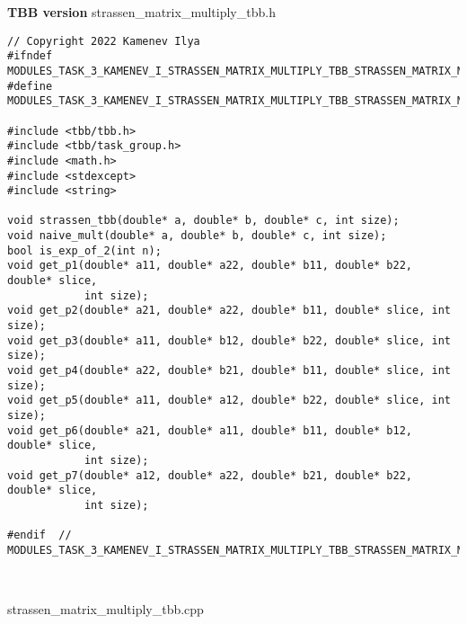 \documentclass{report}
\begin{document}
\textbf{TBB version}
\newline
\newline strassen\_matrix\_multiply\_tbb.h
\begin{lstlisting}
// Copyright 2022 Kamenev Ilya
#ifndef MODULES_TASK_3_KAMENEV_I_STRASSEN_MATRIX_MULTIPLY_TBB_STRASSEN_MATRIX_MULTIPLY_TBB_H_
#define MODULES_TASK_3_KAMENEV_I_STRASSEN_MATRIX_MULTIPLY_TBB_STRASSEN_MATRIX_MULTIPLY_TBB_H_

#include <tbb/tbb.h>
#include <tbb/task_group.h>
#include <math.h>
#include <stdexcept>
#include <string>

void strassen_tbb(double* a, double* b, double* c, int size);
void naive_mult(double* a, double* b, double* c, int size);
bool is_exp_of_2(int n);
void get_p1(double* a11, double* a22, double* b11, double* b22, double* slice,
            int size);
void get_p2(double* a21, double* a22, double* b11, double* slice, int size);
void get_p3(double* a11, double* b12, double* b22, double* slice, int size);
void get_p4(double* a22, double* b21, double* b11, double* slice, int size);
void get_p5(double* a11, double* a12, double* b22, double* slice, int size);
void get_p6(double* a21, double* a11, double* b11, double* b12, double* slice,
            int size);
void get_p7(double* a12, double* a22, double* b21, double* b22, double* slice,
            int size);

#endif  // MODULES_TASK_3_KAMENEV_I_STRASSEN_MATRIX_MULTIPLY_TBB_STRASSEN_MATRIX_MULTIPLY_TBB_H_



\end{lstlisting}
strassen\_matrix\_multiply\_tbb.cpp
\end{document}

